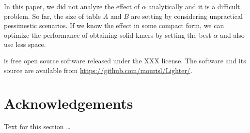 \documentclass[10pt]{article}
\begin{document}



In this paper, we did not analyze the effect of $\alpha$ analytically and it is a difficult problem. So far, the size of table $A$ and $B$ are setting by considering unpractical pessimestic scenarios. If we know the effect in some compact form, we can optimize the performance of obtaining solid kmers by setting the best $\alpha$ and also use less space.

\tool is free open source software released under the XXX license.  The software and its source are available from \url{https://github.com/mourisl/Lighter/}.

\section*{Acknowledgements}
  Text for this section \ldots



\end{document}
